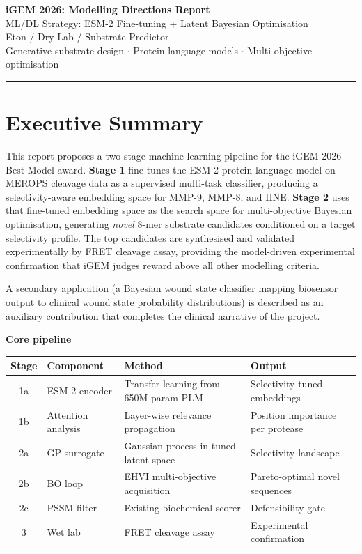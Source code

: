 \documentclass[10pt,a4paper]{article}
\begin{document}
\begin{center}
  {\LARGE\bfseries iGEM 2026: Modelling Directions Report}\\[4pt]
  {\large ML/DL Strategy: ESM-2 Fine-tuning + Latent Bayesian Optimisation}\\[3pt]
  {\small\color{gray} Eton / Dry Lab / Substrate Predictor}\\[1pt]
  {\small\color{gray} Generative substrate design $\cdot$ Protein language models $\cdot$ Multi-objective optimisation}
\end{center}

\vspace{0.5em}\hrule\vspace{0.8em}

\section{Executive Summary}

This report proposes a two-stage machine learning pipeline for the iGEM 2026
Best Model award.
\textbf{Stage 1} fine-tunes the ESM-2 protein language model on MEROPS cleavage
data as a supervised multi-task classifier, producing a selectivity-aware
embedding space for MMP-9, MMP-8, and HNE.
\textbf{Stage 2} uses that fine-tuned embedding space as the search space for
multi-objective Bayesian optimisation, generating \emph{novel} 8-mer substrate
candidates conditioned on a target selectivity profile.
The top candidates are synthesised and validated experimentally by FRET cleavage
assay, providing the model-driven experimental confirmation that iGEM judges
reward above all other modelling criteria.

A secondary application (a Bayesian wound state classifier mapping biosensor
output to clinical wound state probability distributions) is described as an
auxiliary contribution that completes the clinical narrative of the project.

\medskip
\begin{tcolorbox}[colback=boxblue,colframe=blue!40,boxrule=0.5pt]
\textbf{Core pipeline}\\[4pt]
\small
\begin{tabular}{clll}
  \toprule
  Stage & Component & Method & Output\\
  \midrule
  1a & ESM-2 encoder   & Transfer learning from 650M-param PLM & Selectivity-tuned embeddings\\
  1b & Attention analysis & Layer-wise relevance propagation & Position importance per protease\\
  2a & GP surrogate    & Gaussian process in tuned latent space & Selectivity landscape\\
  2b & BO loop         & EHVI multi-objective acquisition & Pareto-optimal novel sequences\\
  2c & PSSM filter     & Existing biochemical scorer & Defensibility gate\\
  3  & Wet lab         & FRET cleavage assay & Experimental confirmation\\
  \bottomrule
\end{tabular}
\end{tcolorbox}
\end{document}
